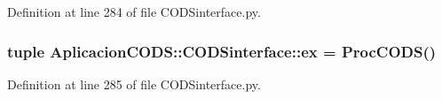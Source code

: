 \-Definition at line 284 of file \-C\-O\-D\-Sinterface.\-py.

\subsubsection[{ex}]{\setlength{\rightskip}{0pt plus 5cm}tuple {\bf \-Aplicacion\-C\-O\-D\-S\-::\-C\-O\-D\-Sinterface\-::ex} = {\bf \-Proc\-C\-O\-D\-S}()}\label{namespace_aplicacion_c_o_d_s_1_1_c_o_d_sinterface_a613dbd217388b875543e7b421fb264ce}


\-Definition at line 285 of file \-C\-O\-D\-Sinterface.\-py.

